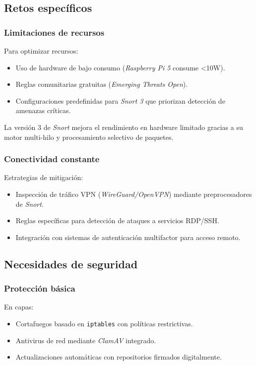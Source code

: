 \documentclass[12pt,a4paper]{report}
\begin{document}
\subsection{Retos específicos}

\subsubsection{Limitaciones de recursos}
Para optimizar recursos:
\begin{itemize}
	\item Uso de hardware de bajo consumo (\textit{Raspberry Pi 5} consume <10W).
	\item Reglas comunitarias gratuitas (\textit{Emerging Threats Open}).
	\item Configuraciones predefinidas para \textit{Snort 3} que priorizan detección de amenazas críticas.
\end{itemize}

La versión 3 de \textit{Snort} mejora el rendimiento en hardware limitado gracias a su motor multi-hilo \cite{park2017performance} y procesamiento selectivo de paquetes.

\subsubsection{Conectividad constante}
Estrategias de mitigación:
\begin{itemize}
	\item Inspección de tráfico VPN (\textit{WireGuard/OpenVPN}) mediante preprocesadores de \textit{Snort}.
	\item Reglas específicas para detección de ataques a servicios RDP/SSH.
	\item Integración con sistemas de autenticación multifactor para acceso remoto.
\end{itemize}

\subsection{Necesidades de seguridad}

\subsubsection{Protección básica}
En capas:
\begin{itemize}
	\item Cortafuegos basado en \texttt{iptables} con políticas restrictivas.
	\item Antivirus de red mediante \textit{ClamAV} integrado.
	\item Actualizaciones automáticas con repositorios firmados digitalmente.
\end{itemize}
\end{document}
